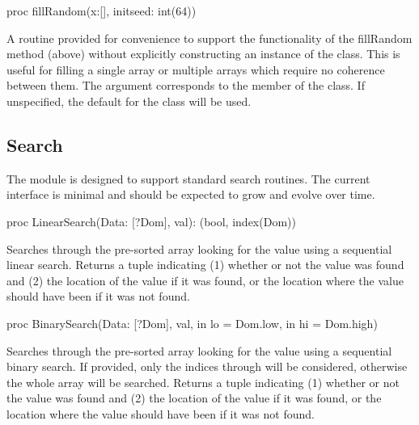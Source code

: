 \begin{protohead}
proc fillRandom(x:[], initseed: int(64))
\end{protohead}
\begin{protobody}
A routine provided for convenience to support the functionality of the
fillRandom method (above) without explicitly constructing an instance
of the  class.  This is useful for filling a single
array or multiple arrays which require no coherence between them.
The  argument corresponds to the  member of
the  class.  If unspecified, the default for the
class will be used.
\end{protobody}

\subsection{Search}
\label{Search}

The  module is designed to support standard search
routines.  The current interface is minimal and should be expected to
grow and evolve over time.

\begin{protohead}
proc LinearSearch(Data: [?Dom], val): (bool, index(Dom))
\end{protohead}
\begin{protobody}
Searches through the pre-sorted array  looking for the
value  using a sequential linear search.  Returns a tuple
indicating (1) whether or not the value was found and (2) the location
of the value if it was found, or the location where the value should
have been if it was not found.
\end{protobody}


\begin{protohead}
proc BinarySearch(Data: [?Dom], val, in lo = Dom.low, in hi = Dom.high)
\end{protohead}
\begin{protobody}
Searches through the pre-sorted array  looking for the
value  using a sequential binary search.  If provided, only
the indices  through  will be considered, otherwise
the whole array will be searched.  Returns a tuple indicating (1)
whether or not the value was found and (2) the location of the value
if it was found, or the location where the value should have been if
it was not found.
\end{protobody}


